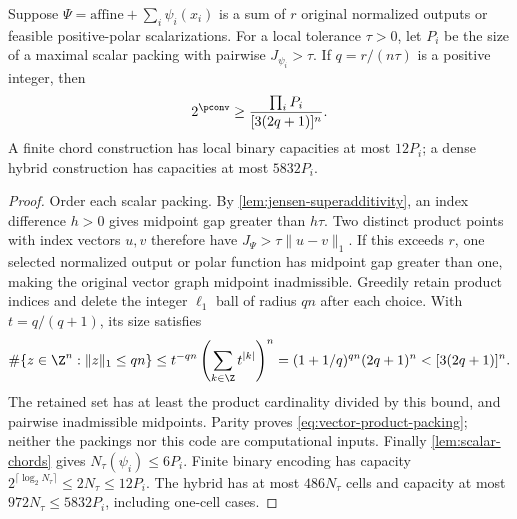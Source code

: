 \begin{lemma}\label{lem:vector-product-packing}
Suppose $\Psi=\text{affine}+\sum_i\psi_i(x_i)$ is a sum of $r$ original
normalized outputs or feasible positive-polar scalarizations. For a local
tolerance $\tau>0$, let $P_i$ be the size of a maximal scalar packing
with pairwise $J_{\psi_i}>\tau$. If $q=r/(n\tau)$ is a positive integer,
then
\begin{equation}\label{eq:vector-product-packing}
 2^{\pconv}\ge\frac{\prod_iP_i}{[3(2q+1)]^n}.
\end{equation}
A finite chord construction has local binary capacities at most $12P_i$;
a dense hybrid construction has capacities at most $5832P_i$.
\end{lemma}
\begin{proof}
Order each scalar packing. By \cref{lem:jensen-superadditivity},
an index difference $h>0$ gives midpoint gap greater than $h\tau$.
Two distinct product points with index vectors $u,v$ therefore have
$J_\Psi>\tau\|u-v\|_1$. If this exceeds $r$, one selected normalized
output or polar function has midpoint gap greater than one, making the
original vector graph midpoint inadmissible.
Greedily retain product indices and delete the integer $\ell_1$ ball
of radius $qn$ after each choice. With $t=q/(q+1)$, its size satisfies
\[
 \#\{z\in\Z^n:\|z\|_1\le qn\}
 \le t^{-qn}\left(\sum_{k\in\Z}t^{|k|}\right)^n
 =(1+1/q)^{qn}(2q+1)^n<[3(2q+1)]^n.
\]
The retained set has at least the product cardinality divided by this
bound, and pairwise inadmissible midpoints. Parity proves
\eqref{eq:vector-product-packing}; neither the packings nor this code
are computational inputs. Finally \cref{lem:scalar-chords} gives
$N_\tau(\psi_i)\le6P_i$. Finite binary encoding has capacity
$2^{\lceil\log_2N_\tau\rceil}\le2N_\tau\le12P_i$.
The hybrid has at most $486N_\tau$ cells and capacity at most
$972N_\tau\le5832P_i$, including one-cell cases.
\end{proof}

